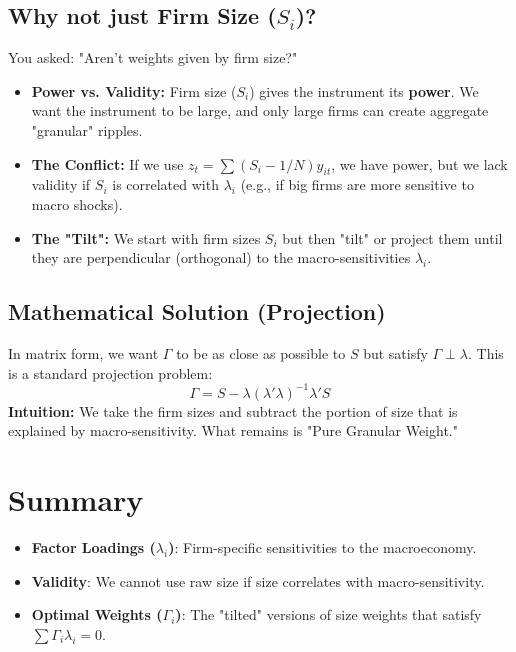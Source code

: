 \documentclass[11pt]{article}
\begin{document}
\subsection{Why not just Firm Size ($S_i$)?}
You asked: "Aren't weights given by firm size?"
\begin{itemize}
    \item \textbf{Power vs. Validity:} Firm size ($S_i$) gives the instrument its \textbf{power}. We want the instrument to be large, and only large firms can create aggregate "granular" ripples.
    \item \textbf{The Conflict:} If we use $z_t = \sum (S_i - 1/N) y_{it}$, we have power, but we lack validity if $S_i$ is correlated with $\lambda_i$ (e.g., if big firms are more sensitive to macro shocks).
    \item \textbf{The "Tilt":} We start with firm sizes $S_i$ but then "tilt" or project them until they are perpendicular (orthogonal) to the macro-sensitivities $\lambda_i$.
\end{itemize}

\subsection{Mathematical Solution (Projection)}
In matrix form, we want $\Gamma$ to be as close as possible to $S$ but satisfy $\Gamma \perp \lambda$. This is a standard projection problem:
\begin{equation}
\Gamma = S - \lambda (\lambda' \lambda)^{-1} \lambda' S
\end{equation}
\textbf{Intuition:} We take the firm sizes and subtract the portion of size that is explained by macro-sensitivity. What remains is "Pure Granular Weight."

\section{Summary}
\begin{itemize}
    \item \textbf{Factor Loadings ($\lambda_i$)}: Firm-specific sensitivities to the macroeconomy.
    \item \textbf{Validity}: We cannot use raw size if size correlates with macro-sensitivity.
    \item \textbf{Optimal Weights ($\Gamma_i$)}: The "tilted" versions of size weights that satisfy $\sum \Gamma_i \lambda_i = 0$.
\end{itemize}
\end{document}
